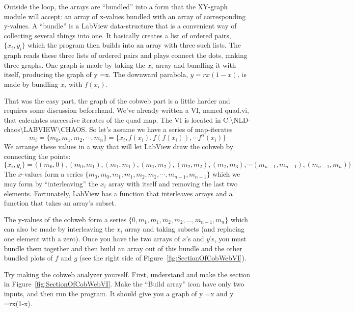 \documentclass{../lab}
\begin{document}
Outside the loop, the arrays are ``bundled'' into a form that the XY-graph module will accept: an array of x-values bundled with an array of corresponding y-values. A ``bundle'' is a LabView data-structure that is a convenient way of collecting several things into one. It basically creates a list of ordered pairs, $\{x_i,y_i\}$ which the program then builds into an array with three such lists. The graph reads these three lists of ordered pairs and plays connect the dots, making three graphs. One graph is made by taking the $x_i$ array and bundling it with itself, producing the graph of y =x. The downward parabola, $y = rx(1-x)$, is made by bundling $x_i$ with $f(x_i)$.

That was the easy part, the graph of the cobweb part is a little harder and requires some discussion beforehand. We've already written a VI, named quad.vi, that calculates successive iterates of the quad map. The VI is located in C:\textbackslash NLD-chaos\textbackslash LABVIEW\textbackslash CHAOS. So let's assume we have a series of map-iterates
\[
    m_i = \{m_0,m_1,m_2, \cdots ,m_n\} = \{x_i,f(x_i),f(f(x_i)),\cdots f^n(x_i)\}
\]
We arrange these values in a way that will let LabView draw the cobweb by connecting the points:
\[
    \{x_i,y_i\} = \{(m_0,0),(m_0,m_1),(m_1,m_1),(m_1,m_2),(m_2,m_2),(m_2,m_3),\cdots (m_{n-1},m_{n-1}),(m_{n-1},m_n)\}
\]
The $x$-values form a series $\{m_0,m_0,m_1,m_1,m_2,m_2,\cdots,m_{n-1},m_{n-1}\}$ which we may form by ``interleaving'' the $x_i$ array with itself and removing the last two elements. Fortunately, LabView has a function that interleaves arrays and a function that takes an array's subset.

The y-values of the cobweb form a series $\{0,m_1,m_1,m_2,m_2,\ldots ,m_{n-1},m_n\}$ which can also be made by interleaving the $x_i$ array and taking subsets (and replacing one element with a zero). Once you have the two arrays of $x$'s and $y$'s, you must bundle them together and then build an array out of this bundle and the other bundled plots of $f$ and $g$ (see the right side of Figure~\ref{fig:SectionOfCobWebVI}).

Try making the cobweb analyzer yourself. First, understand and make the section in Figure~\ref{fig:SectionOfCobWebVI}. Make the ``Build array'' icon have only two inputs, and then run the program. It should give you a graph of y =x and y =rx(1-x).
\end{document}
